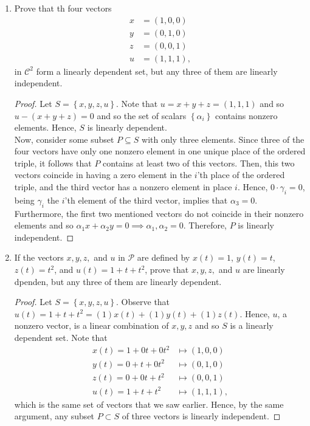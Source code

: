 \documentclass[12pt]{article}
\newenvironment{problem}[2][Problem]{\begin{trivlist} \item[\hskip \labelsep {\bfseries #1}\hskip \labelsep {\bfseries #2.}]}{\end{trivlist}}
\begin{document}
\begin{problem}{1}
\begin{enumerate}
  \item Prove that th four vectors
\begin{align*}
  x &= (1,0,0)\\
  y &= (0,1,0)\\
  z &= (0,0,1)\\
  u &= (1,1,1),
\end{align*}
in $\mathcal{C}^{2}$ form a linearly dependent set, but any three of them are linearly independent.
\begin{proof}
  Let $S=\left\{ x,y,z,u \right\}$. Note that $u= x+y+z = (1,1,1)$ and so $u-(x+y+z) = 0$ and so the set of scalars $\left\{ \alpha_{i} \right\}$ contains nonzero elements. Hence, $S$ is linearly dependent.\\
  Now, consider some subset $P\subseteq S$ with only three elements. Since three of the four vectors have only one nonzero element in one unique place of the ordered triple, it follows that $P$ contains at least two of this vectors. Then, this two vectors coincide in having a zero element in the $i$'th place of the ordered triple, and the third vector has a nonzero element in place $i$. Hence, $0\cdot \gamma_{i} = 0$, being $\gamma_{i}$ the $i$'th element of the third vector, implies that $\alpha_{3} = 0$. Furthermore, the first two mentioned vectors do not coincide in their nonzero elements and so $\alpha_{1} x +\alpha_{2} y =0 \implies \alpha_{1},\alpha_{2}=0$. Therefore, $P$ is linearly independent.
\end{proof}
\item If the vectors $x, y ,z,$ and $u$ in $\mathcal{P}$ are defined by $x(t) = 1$, $y(t) = t$, $z(t) =t^{2}$, and $u(t) = 1+t+t^{2}$, prove that $x,y,z,$ and $u$ are linearly dpenden, but any three of them are linearly dependent.
\begin{proof}
  Let $S=\left\{ x,y,z,u \right\}$. Observe that $u(t) = 1+t+t^{2} = (1)x(t) + (1)y(t) + (1)z(t)$. Hence, $u$, a nonzero vector, is a linear combination of $x,y,z$ and so $S$ is a linearly dependent set.
  Note that 
\begin{align*}
  x(t) = 1+0t+0t^{2} &\mapsto (1,0,0)\\
  y(t) = 0+t+0t^{2} &\mapsto (0,1,0)\\
  z(t) = 0+0t+t^{2} &\mapsto (0,0,1)\\
  u(t) = 1+t+t^{2} &\mapsto (1,1,1),
\end{align*}
which is the same set of vectors that we saw earlier. Hence, by the same argument, any subset $P\subset S$ of three vectors is linearly independent.
\end{proof}
\end{enumerate}
\end{problem}
\end{document}
